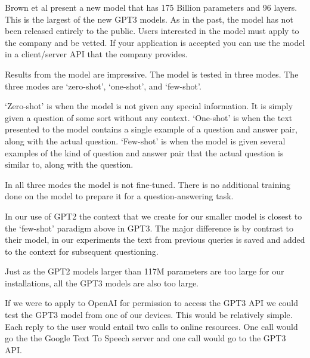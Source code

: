 Brown et al \cite{brown2020language} present a new model that has 175 Billion parameters and 96 layers. This is the largest of the new GPT3 models. As in the past, the model has not been released entirely to the public. Users interested in the model must apply to the company and be vetted. If your application is accepted you can use the model in a client/server API that the company provides.

Results from the model are impressive. The model is tested in three modes. The three modes are `zero-shot', `one-shot', and `few-shot'. 

`Zero-shot' is when the model is not given any special information. It is simply given a question of some sort without any context. `One-shot' is when the text presented to the model contains a single example of a question and answer pair, along with the actual question. `Few-shot' is when the model is given several examples of the kind of question and answer pair that the actual question is similar to, along with the question.

In all three modes the model is not fine-tuned. There is no additional training done on the model to prepare it for a question-answering task.

In our use of GPT2 the context that we create for our smaller model is closest to the `few-shot' paradigm above in GPT3. The major difference is by contrast to their model, in our experiments the text from previous queries is saved and added to the context for subsequent questioning.

Just as the GPT2 models larger than 117M parameters are too large for our installations, all the GPT3 models are also too large. 

If we were to apply to OpenAI for permission to access the GPT3 API we could test the GPT3 model from one of our devices. This would be relatively simple. Each reply to the user would entail two calls to online resources. One call would go the the Google Text To Speech server and one call would go to the GPT3 API.